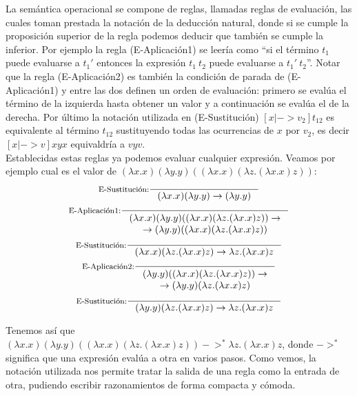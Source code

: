 La semántica operacional se compone de reglas, llamadas reglas de evaluación, las cuales toman prestada la notación de la deducción natural, donde si se cumple la proposición superior de la regla podemos deducir que también se cumple la inferior. Por ejemplo la regla (E-Aplicación1) se leería como ``si el término $t_1$ puede evaluarse a $t_1'$ entonces la expresión $t_1\ t_2$ puede evaluarse a $t_1'\ t_2$''. Notar que la regla (E-Aplicación2) es también la condición de parada de (E-Aplicación1) y entre las dos definen un orden de evaluación: primero se evalúa el término de la izquierda hasta obtener un valor y a continuación se evalúa el de la derecha.
Por último la notación utilizada en (E-Sustitución) $[x |-> v_2]t_{12}$ es equivalente al término $t_{12}$ sustituyendo todas las ocurrencias de $x$ por $v_2$, es decir $[x |-> v]xyx$ equivaldría a $vyv$.\\

Establecidas estas reglas ya podemos evaluar cualquier expresión. Veamos por ejemplo cual es el valor de $(\lambda x.x) (\lambda y.y) ((\lambda x.x) (\lambda z.(\lambda x.x) z))$:\\


\begin{gather*}
\inference[E-Sustitución:]{}{(\lambda x.x)(\lambda y.y) -> (\lambda y.y)} \\
\inference[E-Aplicación1:]{}{
\begin{array}{@{}c@{}}
(\lambda x.x) (\lambda y.y) ((\lambda x.x) (\lambda z.(\lambda x.x) z)) -> \\
 -> (\lambda y.y) ((\lambda x.x) (\lambda z.(\lambda x.x) z))
\end{array}} \\
\inference[E-Sustitución:]{}{(\lambda x.x) (\lambda z.(\lambda x.x) z) -> \lambda z.(\lambda x.x) z} \\
\inference[E-Aplicación2:]{}{
\begin{array}{@{}c@{}}
(\lambda y.y) ((\lambda x.x) (\lambda z.(\lambda x.x) z)) -> \\
 -> (\lambda y.y) (\lambda z.(\lambda x.x) z)
\end{array}} \\
\inference[E-Sustitución:]{}{(\lambda y.y) (\lambda z.(\lambda x.x) z) -> \lambda z.(\lambda x.x) z}
\end{gather*}
\bigskip


Tenemos así que $(\lambda x.x) (\lambda y.y) ((\lambda x.x) (\lambda z.(\lambda x.x) z)) ->^{*} \lambda z.(\lambda x.x) z$, donde $->^{*}$ significa que una expresión evalúa a otra en varios pasos. Como vemos, la notación utilizada nos permite tratar la salida de una regla como la entrada de otra, pudiendo escribir razonamientos de forma compacta y cómoda.\\

